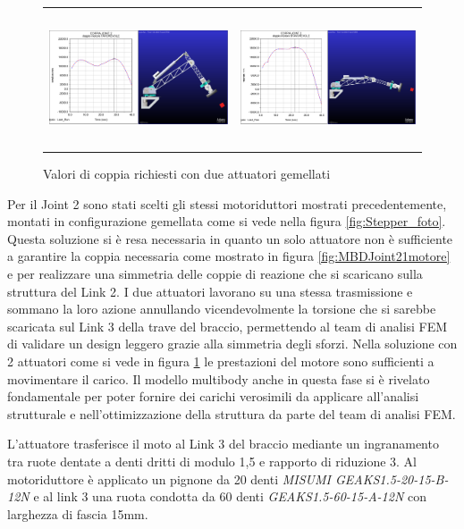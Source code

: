 \documentclass[%
corpo=11pt,
twoside,
 stile=classica,
oldstyle,
greek,%
]{toptesi}
\begin{document}
		\begin{figure} [!ht]
			\centering
			\begin{tabular}{ll}
				\includegraphics[height=4cm,keepaspectratio]{Plots/SPALLA/2motori/JOINT22favorevole.png}
				&
				\includegraphics[height=4cm,keepaspectratio]{Plots/SPALLA/2motori/JOINT22sfavorevole.png}
			\end{tabular}
			\caption{Valori di coppia richiesti con due attuatori gemellati}
			\label{fig:MBDJoint22motore}
		\end{figure}
		Per il Joint 2 sono stati scelti gli stessi motoriduttori mostrati precedentemente, montati in configurazione gemellata come si vede nella figura \ref{fig:Stepper_foto}. 
		Questa soluzione si è resa necessaria in quanto un solo attuatore non è sufficiente a garantire la coppia necessaria come mostrato in figura \ref{fig:MBDJoint21motore} e per realizzare una simmetria delle coppie di reazione che si scaricano sulla struttura del Link 2. 
		I due attuatori lavorano su una stessa trasmissione e sommano la loro azione annullando vicendevolmente la torsione che si sarebbe scaricata sul Link 3 della trave del braccio, permettendo al team di analisi FEM di validare un design leggero grazie alla simmetria degli sforzi. Nella soluzione con 2 attuatori come si vede in figura \ref{fig:MBDJoint22motore} le prestazioni del motore sono sufficienti a movimentare il carico. 
		Il modello multibody anche in questa fase si è rivelato fondamentale per poter fornire dei carichi verosimili da applicare all'analisi strutturale e nell'ottimizzazione della struttura da parte del team di analisi FEM. 
		
		L'attuatore trasferisce il moto al Link 3 del braccio mediante un ingranamento tra ruote dentate a denti dritti di modulo 1,5 e rapporto di riduzione 3. Al motoriduttore è applicato un pignone da 20 denti \textit{MISUMI GEAKS1.5-20-15-B-12N} e al link 3 una ruota condotta da 60 denti \textit{GEAKS1.5-60-15-A-12N} con larghezza di fascia 15mm. 
		
\end{document}
